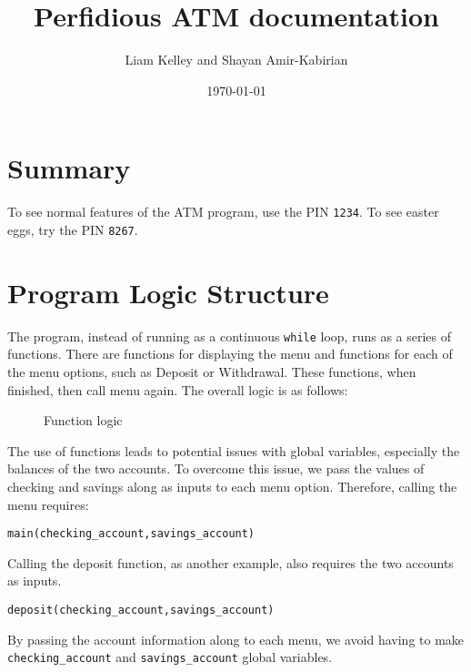 \documentclass{article}
\begin{document}
\title{Perfidious ATM documentation}
\author{Liam Kelley and Shayan Amir-Kabirian}
\date{\today}
\maketitle

\section*{Summary}
To see normal features of the ATM program, use the PIN \texttt{1234}. To see easter eggs, try the PIN \texttt{8267}.

\section{Program Logic Structure}
The program, instead of running as a continuous \texttt{while} loop, runs as a series of functions. There are functions for displaying the menu and functions for each of the menu options, such as Deposit or Withdrawal. These functions, when finished, then call menu again. The overall logic is as follows:

\begin{figure}[h!]
\centering
{}

\caption{Function logic}
\end{figure}

The use of functions leads to potential issues with global variables, especially the balances of the two accounts. To overcome this issue, we pass the values of checking and savings along as inputs to each menu option. Therefore, calling the menu requires:
\begin{lstlisting}
main(checking_account,savings_account)
\end{lstlisting}
Calling the deposit function, as another example, also requires the two accounts as inputs.
\begin{lstlisting}
deposit(checking_account,savings_account)
\end{lstlisting}
By passing the account information along to each menu, we avoid having to make \texttt{checking\_account} and \texttt{savings\_account} global variables.
\end{document}
